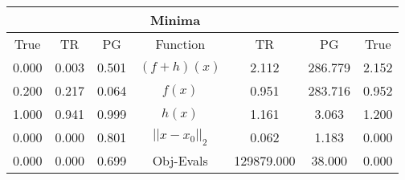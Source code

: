 \begin{tabular}{| c |c |c || c |c |c |c |}
    \hline
    \rowcolor[gray]{0.9}
\multicolumn{3}{|c|}{Parameters} & \multicolumn{4}{|c|}{Minima}\\ \hline True & TR & PG  & Function & TR & PG & True \\
    \hline
  \rowcolor[gray]{0.7}
  0.000 & 0.003 & 0.501   & $ (f + h)(x) $ & 2.112 & 286.779 & 2.152 \\
  \rowcolor[gray]{0.8}
  0.200 & 0.217 & 0.064   & $ f(x) $ & 0.951 & 283.716 & 0.952 \\
  \rowcolor[gray]{0.7}
  1.000 & 0.941 & 0.999   & $ h(x) $ & 1.161 & 3.063 & 1.200 \\
  \rowcolor[gray]{0.8}
  0.000 & 0.000 & 0.801   & $ ||x - x_0||_2 $ & 0.062 & 1.183 & 0.000 \\
  \rowcolor[gray]{0.7}
  0.000 & 0.000 & 0.699   & Obj-Evals & 129879.000 & 38.000 & 0.000 \\
\end{tabular}
